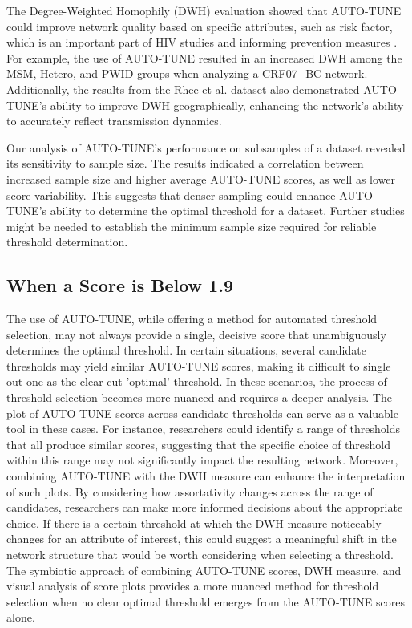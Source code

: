 \documentclass[utf8]{FrontiersinHarvard} %
\newcommand{\TODO}[1]{{\color{red}{#1}}}
\begin{document}
The Degree-Weighted Homophily (DWH) evaluation showed that AUTO-TUNE could
improve network quality based on specific attributes, such as risk factor,
which is an important part of HIV studies and informing prevention measures
\citep{potterat_risk_2002,fujimoto_methodological_2021}. For example, the use of
AUTO-TUNE resulted in an increased DWH among the MSM, Hetero, and PWID groups
when analyzing a CRF07\_BC network. Additionally, the results from the Rhee et
al. dataset also demonstrated AUTO-TUNE's ability to improve DWH
geographically, enhancing the network's ability to accurately reflect
transmission dynamics.

Our analysis of AUTO-TUNE's performance on subsamples of a dataset revealed its
sensitivity to sample size. The results indicated a correlation between
increased sample size and higher average AUTO-TUNE scores, as well as lower
score variability. This suggests that denser sampling could enhance AUTO-TUNE's
ability to determine the optimal threshold for a dataset. Further studies might
be needed to establish the minimum sample size required for reliable threshold
determination.

\subsection{When a Score is Below 1.9}

\TODO{add some text to explain that multiple scores at different thresholds could be indicative of inherently different scales in the network, e.g. global AND local combined into one}

The use of AUTO-TUNE, while offering a method for automated threshold
selection, may not always provide a single, decisive score that unambiguously
determines the optimal threshold. In certain situations, several candidate
thresholds may yield similar AUTO-TUNE scores, making it difficult to single
out one as the clear-cut 'optimal' threshold. In these scenarios, the process
of threshold selection becomes more nuanced and requires a deeper analysis. The
plot of AUTO-TUNE scores across candidate thresholds can serve as a valuable
tool in these cases. For instance, researchers could identify a range of
thresholds that all produce similar scores, suggesting that the specific choice
of threshold within this range may not significantly impact the resulting
network. Moreover, combining AUTO-TUNE with the DWH measure can enhance the
interpretation of such plots. By considering how assortativity changes across
the range of candidates, researchers can make more informed decisions about the
appropriate choice. If there is a certain threshold at which the DWH measure
noticeably changes for an attribute of interest, this could suggest a
meaningful shift in the network structure that would be worth considering when
selecting a threshold. The symbiotic approach of combining AUTO-TUNE scores,
DWH measure, and visual analysis of score plots provides a more nuanced method
for threshold selection when no clear optimal threshold emerges from the
AUTO-TUNE scores alone.
\end{document}
